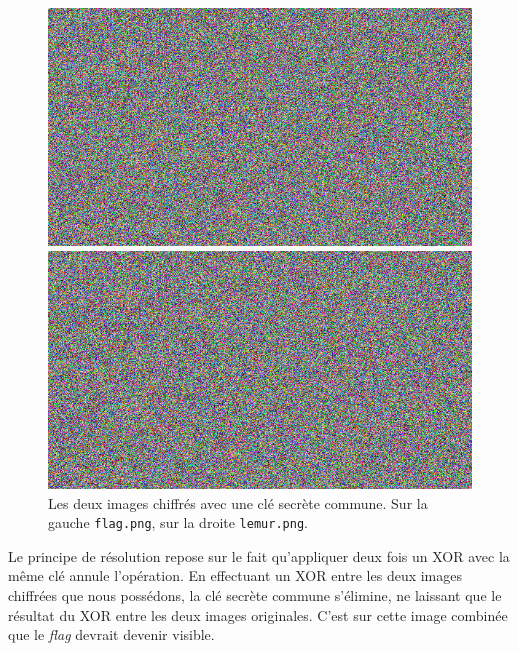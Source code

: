 \begin{figure}[htbp] %
    \centering %

    \begin{minipage}{0.48\textwidth}
        \centering
        \includegraphics[width=\linewidth]{Images/Lemur/flag.png}
    \end{minipage}
    \hfill %
    \begin{minipage}{0.48\textwidth}
        \centering
        \includegraphics[width=\linewidth]{Images/Lemur/lemur.png}
    \end{minipage}

    \caption{Les deux images chiffrés avec une clé secrète commune. Sur la gauche \texttt{flag.png}, sur la droite \texttt{lemur.png}.}
    \label{fig:lemurChall}
\end{figure}

Le principe de résolution repose sur le fait qu'appliquer deux fois un XOR
avec la même clé annule l'opération. En effectuant un XOR entre les deux
images chiffrées que nous possédons, la clé secrète commune s'élimine,
ne laissant que le résultat du XOR entre les deux images originales.
C'est sur cette image combinée que le \textit{flag} devrait devenir
visible.

